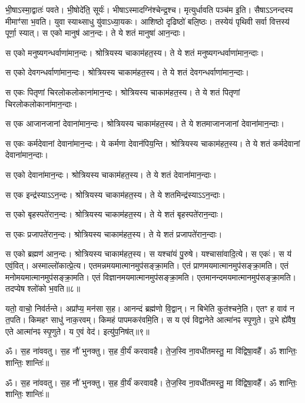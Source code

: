 भी॒षाऽस्मा॒द्वातः॑ पवते। 
भी॒षोदे॑ति॒ सूर्यः॑। 
भीषाऽस्मादग्नि॑\-श्चेन्द्र॒श्च। 
मृत्युर्धावति पञ्च॑म इ॒ति। 
सैषाऽऽनन्दस्य मीमाꣳ॑सा भ॒वति। 
युवा स्याथ्साधु यु॑वाऽध्या॒यकः। 
आशिष्ठो दृढिष्ठो॑ बलि॒ष्ठः। 
तस्येयं पृथिवी सर्वा वित्तस्य॑ पूर्णा॒ स्यात्। 
स एको मानुष॑ आन॒न्दः। 
ते ये शतं मानुषा॑ आन॒न्दाः। 

स एको मनुष्यगन्धर्वाणा॑\-मान॒न्दः। 
श्रोत्रियस्य चाकाम॑हत॒स्य। 
ते ये शतं मनुष्यगन्धर्वाणा॑मान॒न्दाः। 

स एको देवगन्धर्वाणा॑\-मान॒न्दः। 
श्रोत्रियस्य चाकाम॑हत॒स्य। 
ते ये शतं देवगन्धर्वाणा॑मान॒न्दाः। 

स एकः पितृणां चिरलोकलोकाना॑\-मान॒न्दः। 
श्रोत्रियस्य चाकाम॑हत॒स्य। 
ते ये शतं पितृणां चिरलोकलोकाना॑\-मान॒न्दाः। 

स एक आजानजानां देवाना॑\-मान॒न्दः। 
श्रोत्रियस्य चाकाम॑हत॒स्य। 
ते ये शतमाजानजानां देवाना॑मान॒न्दाः। 

स एकः कर्मदेवानां देवाना॑\-मान॒न्दः। 
ये कर्मणा देवान॑पिय॒न्ति। 
श्रोत्रियस्य चाकाम॑हत॒स्य। 
ते ये शतं कर्मदेवानां देवाना॑मान॒न्दाः। 

स एको देवाना॑\-मान॒न्दः। 
श्रोत्रियस्य चाकाम॑हत॒स्य। 
ते ये शतं देवाना॑मान॒न्दाः। 

स एक इन्द्र॑स्याऽऽन॒न्दः। 
श्रोत्रियस्य चाकाम॑हत॒स्य। 
ते ये शतमिन्द्र॑स्याऽऽन॒न्दाः। 

स एको बृहस्पते॑रान॒न्दः। 
श्रोत्रियस्य चाकाम॑हत॒स्य। 
ते ये शतं बृहस्पते॑रान॒न्दाः। 

स एकः प्रजापते॑रान॒न्दः। 
श्रोत्रियस्य चाकाम॑हत॒स्य। 
ते ये शतं प्रजापते॑रान॒न्दाः। 

स एको ब्रह्मण॑ आन॒न्दः। 
श्रोत्रियस्य चाकाम॑हत॒स्य। 
स यश्चा॑यं पु॒रुषे। 
यश्चासा॑वादि॒त्ये। 
स एकः॑। 
स य॑ एवं॒वित्। 
अस्माल्लो॑कात्प्रे॒त्य। 
एतमन्न\-मय\-मात्मानमुप॑सङ्क्रा॒मति। 
एतं प्राण\-मय\-मात्मानमुप॑सङ्क्रा॒मति। 
एतं मनो\-मय\-मात्मानमुप॑\-सङ्क्रा॒मति। 
एतं विज्ञान\-मय\-मात्मानमुप॑\-सङ्क्रा॒मति। 
एतमानन्द\-मय\-मात्मानमुप॑\-सङ्क्रा॒मति। 
तदप्येष श्लो॑को भ॒वति॥८॥

यतो॒ वाचो॒ निव॑र्तन्ते। 
अप्रा᳚प्य॒ मन॑सा स॒ह। 
आनन्दं ब्रह्म॑णो वि॒द्वान्। 
न बिभेति कुत॑श्चने॒ति। 
एतꣳ ह वाव॑ न त॒पति। 
किमहꣳ साधु॑ नाक॒रवम्। 
किमहं पापमकर॑वमि॒ति। 
स य एवं विद्वानेते आत्मा॑नꣴ स्पृ॒णुते। 
उ॒भे ह्ये॑वैष॒ एते आत्मा॑नꣴ स्पृ॒णुते। 
य ए॒वं वेद॑। 
इत्यु॑प॒निष॑त्॥९॥

ॐ। स॒ह ना॑ववतु। 
स॒ह नौ॑ भुनक्तु। 
स॒ह वी॒र्यं॑ करवावहै। 
ते॒ज॒स्वि ना॒वधी॑तमस्तु॒ मा वि॑द्विषा॒वहै᳚। 
ॐ शान्तिः॒ शान्तिः॒ शान्तिः॑॥

\setcounter{anuvakam}{0}
ॐ। स॒ह ना॑ववतु। 
स॒ह नौ॑ भुनक्तु। 
स॒ह वी॒र्यं॑ करवावहै। 
ते॒ज॒स्वि ना॒वधी॑तमस्तु॒ मा वि॑द्विषा॒वहै᳚। 
ॐ शान्तिः॒ शान्तिः॒ शान्तिः॑॥


